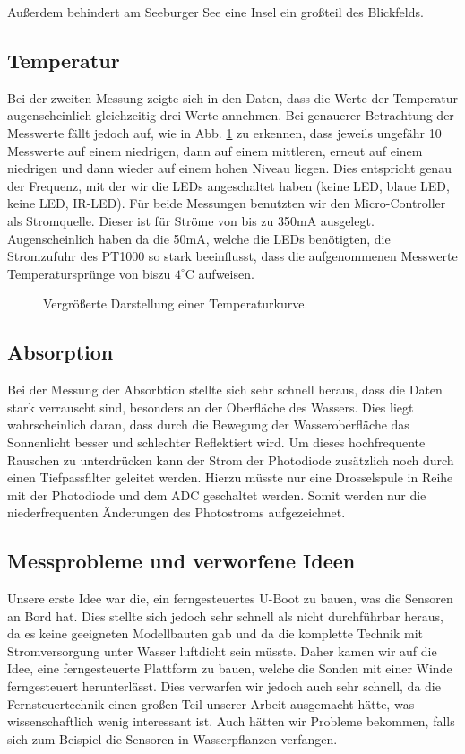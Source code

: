 \documentclass[12pt,a4paper,titlepage,headinclude,bibtotoc]{scrartcl}
\begin{document}
Außerdem behindert am Seeburger See eine Insel ein großteil des Blickfelds.


\subsection{Temperatur}
Bei der zweiten Messung zeigte sich in den Daten, dass die Werte der Temperatur augenscheinlich gleichzeitig drei Werte annehmen.
Bei genauerer Betrachtung der Messwerte fällt jedoch auf, wie in Abb. \ref{fig:tempSprung} zu erkennen, dass jeweils ungefähr 10 Messwerte auf einem niedrigen, dann auf einem mittleren, erneut auf einem niedrigen und dann wieder auf einem hohen Niveau liegen.
Dies  entspricht genau der Frequenz, mit der wir die LEDs angeschaltet haben (keine LED, blaue LED, keine LED, IR-LED).
Für beide Messungen benutzten wir den Micro-Controller als Stromquelle.
Dieser ist für Ströme von bis zu 350mA ausgelegt.
Augenscheinlich haben da die 50mA, welche die LEDs benötigten, die Stromzufuhr des PT1000 so stark beeinflusst, dass die aufgenommenen Messwerte Temperatursprünge von biszu $4^\circ $C aufweisen.

\begin{figure}[h]
	\centering
	
	\caption{Vergrößerte Darstellung einer Temperaturkurve.}
	\label{fig:tempSprung}
\end{figure}



\subsection{Absorption}
Bei der Messung der Absorbtion stellte sich sehr schnell heraus, dass die Daten stark verrauscht sind, besonders an der Oberfläche des Wassers.
Dies liegt wahrscheinlich daran, dass durch die Bewegung der Wasseroberfläche das Sonnenlicht besser und schlechter Reflektiert wird.
Um dieses hochfrequente Rauschen zu unterdrücken kann der Strom der Photodiode zusätzlich noch durch einen Tiefpassfilter geleitet werden.
Hierzu müsste nur eine Drosselspule in Reihe mit der Photodiode und dem ADC geschaltet werden.
Somit werden nur die niederfrequenten Änderungen des Photostroms aufgezeichnet.


\subsection{Messprobleme und verworfene Ideen}
Unsere erste Idee war die, ein ferngesteuertes U-Boot zu bauen, was die Sensoren an Bord hat.
Dies stellte sich jedoch sehr schnell als nicht durchführbar heraus, da es keine geeigneten Modellbauten gab und da die komplette Technik mit Stromversorgung unter Wasser luftdicht sein müsste.
Daher kamen wir auf die Idee, eine ferngesteuerte Plattform zu bauen, welche die Sonden mit einer Winde ferngesteuert herunterlässt.
Dies verwarfen wir jedoch auch sehr schnell, da die Fernsteuertechnik einen großen Teil unserer Arbeit ausgemacht hätte, was wissenschaftlich wenig interessant ist.
Auch hätten wir Probleme bekommen, falls sich zum Beispiel die Sensoren in Wasserpflanzen verfangen.
\end{document}
